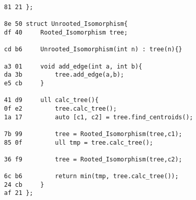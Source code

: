 \documentclass[11pt, a4paper, twoside]{article}
\begin{document}
\begin{lstlisting}
81 21 };

8e 50 struct Unrooted_Isomorphism{
df 40     Rooted_Isomorphism tree;
      
cd b6     Unrooted_Isomorphism(int n) : tree(n){}
      
a3 01     void add_edge(int a, int b){
da 3b         tree.add_edge(a,b);
e5 cb     }
      
41 d9     ull calc_tree(){
0f e2         tree.calc_tree();
1a 17         auto [c1, c2] = tree.find_centroids();
              
7b 99         tree = Rooted_Isomorphism(tree,c1);
85 0f         ull tmp = tree.calc_tree();
      
36 f9         tree = Rooted_Isomorphism(tree,c2);
      
6c b6         return min(tmp, tree.calc_tree());
24 cb     }
af 21 };
\end{lstlisting}
\end{document}
